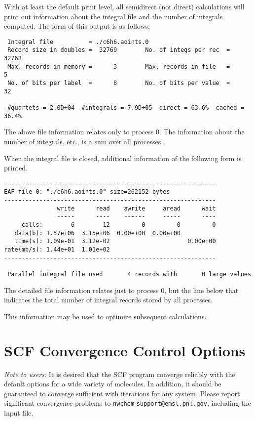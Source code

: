 With at least the default print level, all semidirect (not direct)
calculations will print out information about the integral file and
the number of integrals computed.  The form of this output is as
follows;

\begin{verbatim}
 Integral file          = ./c6h6.aoints.0
 Record size in doubles =  32769        No. of integs per rec  =  32768
 Max. records in memory =      3        Max. records in file   =      5
 No. of bits per label  =      8        No. of bits per value  =     32

 #quartets = 2.0D+04  #integrals = 7.9D+05  direct = 63.6%  cached = 36.4%
\end{verbatim}

The above file information relates only to process 0.  The information
about the number of integrals, etc., is a sum over all processes.

When the integral file is closed, additional information of the following
form is printed.

\begin{verbatim}
------------------------------------------------------------
EAF file 0: "./c6h6.aoints.0" size=262152 bytes
------------------------------------------------------------
               write      read    awrite     aread      wait
               -----      ----    ------     -----      ----
     calls:        6        12         0         0         0
   data(b): 1.57e+06  3.15e+06  0.00e+00  0.00e+00
   time(s): 1.09e-01  3.12e-02                      0.00e+00
rate(mb/s): 1.44e+01  1.01e+02
------------------------------------------------------------

 Parallel integral file used       4 records with       0 large values
\end{verbatim}
The detailed file information relates just to process 0, but the 
line below that indicates the total number of integral records stored
by all processes.  

This information may be used to optimize subsequent calculations.


\section{SCF Convergence Control Options}
\label{sec:scfconv}

{\em Note to users:} It is desired that the SCF program converge
reliably with the default options for a wide variety of molecules.  In
addition, it should be guaranteed to converge sufficient with
iterations for any system.  Please report significant convergence
problems to \verb+nwchem+-\verb+support@+\-\verb+emsl.pnl.gov+,
including the input file.

